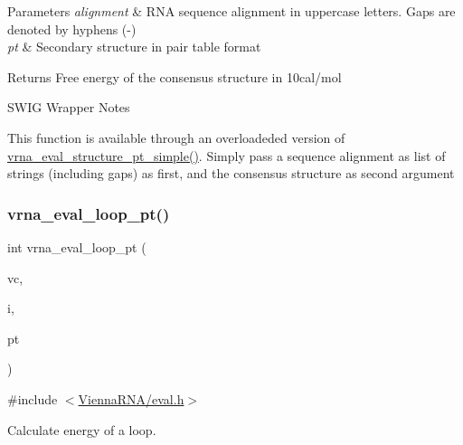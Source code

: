\begin{DoxyParams}{Parameters}
{\em alignment} & R\+NA sequence alignment in uppercase letters. Gaps are denoted by hyphens (\textquotesingle{}-\/\textquotesingle{}) \\
\hline
{\em pt} & Secondary structure in pair table format \\
\hline
\end{DoxyParams}
\begin{DoxyReturn}{Returns}
Free energy of the consensus structure in 10cal/mol
\end{DoxyReturn}
\begin{DoxyRefDesc}{S\+W\+I\+G Wrapper Notes}
\item[\hyperlink{wrappers__wrappers000054}{S\+W\+I\+G Wrapper Notes}]This function is available through an overloadeded version of \hyperlink{group__eval_ga0bba59b4d6e53461088666ff4aece7b0}{vrna\+\_\+eval\+\_\+structure\+\_\+pt\+\_\+simple()}. Simply pass a sequence alignment as list of strings (including gaps) as first, and the consensus structure as second argument \end{DoxyRefDesc}
\mbox{\label{group__eval_ga730ba4df55c02fd530a0cddd49faf760}} 
\subsubsection{\texorpdfstring{vrna\+\_\+eval\+\_\+loop\+\_\+pt()}{vrna\_eval\_loop\_pt()}}
{\footnotesize\ttfamily int vrna\+\_\+eval\+\_\+loop\+\_\+pt (\begin{DoxyParamCaption}\item[{\hyperlink{group__fold__compound_ga1b0cef17fd40466cef5968eaeeff6166}{vrna\+\_\+fold\+\_\+compound\+\_\+t} $\ast$}]{vc,  }\item[{int}]{i,  }\item[{const short $\ast$}]{pt }\end{DoxyParamCaption})}



{\ttfamily \#include $<$\hyperlink{eval_8h}{Vienna\+R\+N\+A/eval.\+h}$>$}



Calculate energy of a loop. 


